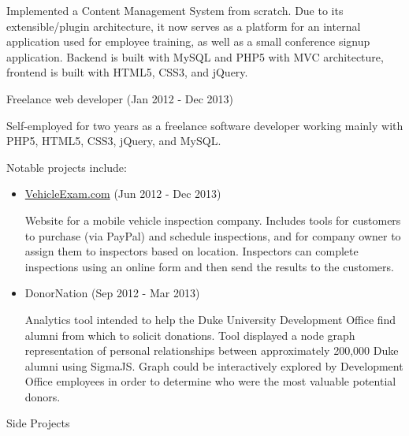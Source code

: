 \documentclass{article}
\begin{document}
    Implemented a Content Management System from scratch. Due to its extensible/plugin architecture, it now serves as a platform for an internal application used for employee training, as well as a small conference signup application. Backend is built with MySQL and PHP5 with MVC architecture, frontend is built with HTML5, CSS3, and jQuery.


    \bigskip\bigskip

    {
        \large
        Freelance web developer 
        {
            \color{fade-gray}
            \small
            (Jan 2012 - Dec 2013)
        }
    }

    \medskip

    Self-employed for two years as a freelance software developer working mainly with PHP5, HTML5, CSS3, jQuery, and MySQL. 
    
    \smallskip

    Notable projects include:

    \begin{itemize}
        \item \href{http://vehicleexam.com}{VehicleExam.com}
        {
            \color{fade-gray}
            \small
            (Jun 2012 - Dec 2013)
        }

        Website for a mobile vehicle inspection company. Includes tools for customers to purchase (via PayPal) and schedule inspections, and for company owner to assign them to inspectors based on location. Inspectors can complete inspections using an online form and then send the results to the customers.

        \item DonorNation
        {
            \color{fade-gray}
            \small
            (Sep 2012 - Mar 2013)
        }

        Analytics tool intended to help the Duke University Development Office find alumni from which to solicit donations. Tool displayed a node graph representation of personal relationships between approximately 200,000 Duke alumni using SigmaJS. Graph could be interactively explored by Development Office employees in order to determine who were the most valuable potential donors.

    \end{itemize}


    \bigskip\bigskip\bigskip

    {
        \noindent\Large
        Side Projects
    }

    \noindent\makebox[\linewidth]{\rule{\textwidth}{0.4pt}}
    \medskip
\end{document}

